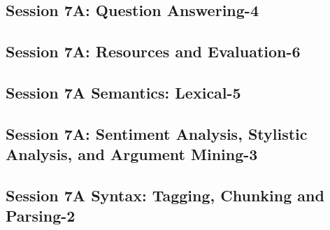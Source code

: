 \subsection{\large Session 7A: Question Answering-4}
\label{parallel-session-7A-trackE}
\TrackELoc\hfill\sessionchair{}{}
\clearpage
\subsection{\large Session 7A: Resources and Evaluation-6}
\label{parallel-session-7A-trackF}
\TrackFLoc\hfill\sessionchair{}{}
\clearpage
\subsection{\large Session 7A Semantics: Lexical-5}
\label{parallel-session-7A-trackG}
\TrackGLoc\hfill\sessionchair{}{}
\clearpage
\subsection{\large Session 7A: Sentiment Analysis, Stylistic Analysis, and Argument Mining-3}
\label{parallel-session-7A-trackH}
\TrackHLoc\hfill\sessionchair{}{}
\clearpage
\subsection{\large Session 7A Syntax: Tagging, Chunking and Parsing-2}
\label{parallel-session-7A-trackI}
\TrackILoc\hfill\sessionchair{}{}
\clearpage


